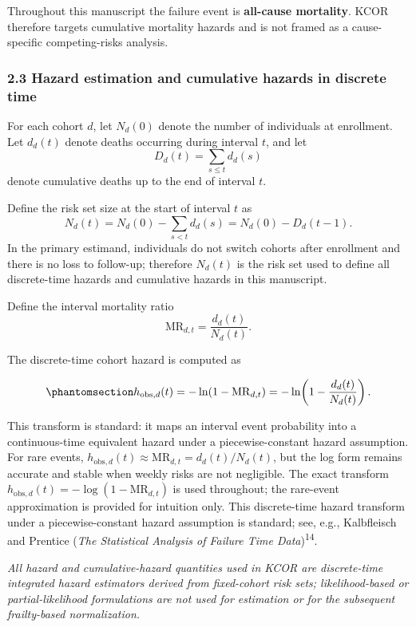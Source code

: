 \documentclass[
]{article}
\begin{document}
Throughout this manuscript the failure event is \textbf{all-cause mortality}. KCOR therefore targets cumulative mortality hazards and is not framed as a cause-specific competing-risks analysis.

\subsubsection{2.3 Hazard estimation and cumulative hazards in discrete time}\label{hazard-estimation-and-cumulative-hazards-in-discrete-time}

For each cohort \(d\), let \(N_d(0)\) denote the number of individuals at enrollment. Let \(d_d(t)\) denote deaths occurring during interval \(t\), and let \[D_d(t) = \sum_{s \le t} d_d(s)\] denote cumulative deaths up to the end of interval \(t\).

Define the risk set size at the start of interval \(t\) as \[N_d(t) = N_d(0) - \sum_{s < t} d_d(s) = N_d(0) - D_d(t-1).\] In the primary estimand, individuals do not switch cohorts after enrollment and there is no loss to follow-up; therefore \(N_d(t)\) is the risk set used to define all discrete-time hazards and cumulative hazards in this manuscript.

Define the interval mortality ratio \[\mathrm{MR}_{d,t} = \frac{d_d(t)}{N_d(t)}.\]

The discrete-time cohort hazard is computed as

\begin{equation}\protect\phantomsection\label{eq:hazard-discrete}{h_{\mathrm{obs},d}(t) = -\ln\!\left(1 - \mathrm{MR}_{d,t}\right) = -\ln\!\left(1 - \frac{d_d(t)}{N_d(t)}\right).}\end{equation}

This transform is standard: it maps an interval event probability into a continuous-time equivalent hazard under a piecewise-constant hazard assumption. For rare events, \(h_{\mathrm{obs},d}(t) \approx \mathrm{MR}_{d,t} = d_d(t)/N_d(t)\), but the log form remains accurate and stable when weekly risks are not negligible. The exact transform \(h_{\mathrm{obs},d}(t) = -\log(1 - \mathrm{MR}_{d,t})\) is used throughout; the rare-event approximation is provided for intuition only. This discrete-time hazard transform under a piecewise-constant hazard assumption is standard; see, e.g., Kalbfleisch and Prentice (\emph{The Statistical Analysis of Failure Time Data})\textsuperscript{14}.

\emph{All hazard and cumulative-hazard quantities used in KCOR are discrete-time integrated hazard estimators derived from fixed-cohort risk sets; likelihood-based or partial-likelihood formulations are not used for estimation or for the subsequent frailty-based normalization.}
\end{document}
